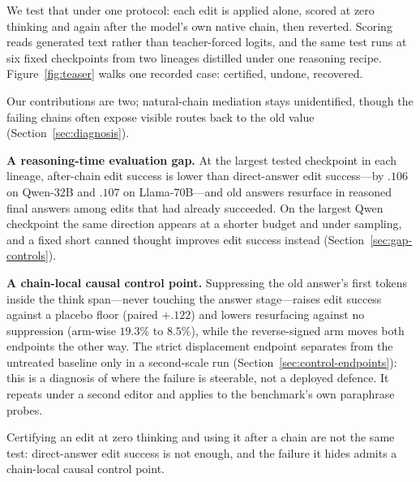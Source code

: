 \documentclass[letterpaper]{article} %
\begin{document}
We test that under one protocol: each edit is applied alone, scored at zero thinking and again after the model's own native chain, then reverted.  Scoring reads generated text rather than teacher-forced logits, and the same test runs at six fixed checkpoints from two lineages distilled under one reasoning recipe.  Figure~\ref{fig:teaser} walks one recorded case: certified, undone, recovered.

Our contributions are two; natural-chain mediation stays unidentified, though the failing chains often expose visible routes back to the old value (Section~\ref{sec:diagnosis}).

\textbf{A reasoning-time evaluation gap.}  At the largest tested checkpoint in each lineage, after-chain edit success is lower than direct-answer edit success---by \(.106\) on Qwen-32B and \(.107\) on Llama-70B---and old answers resurface in reasoned final answers among edits that had already succeeded.  On the largest Qwen checkpoint the same direction appears at a shorter budget and under sampling, and a fixed short canned thought improves edit success instead (Section~\ref{sec:gap-controls}). %

\textbf{A chain-local causal control point.}  Suppressing the old answer's first tokens inside the think span---never touching the answer stage---raises edit success against a placebo floor (paired \(+.122\)) and lowers resurfacing against no suppression (arm-wise \(19.3\%\) to \(8.5\%\)), while the reverse-signed arm moves both endpoints the other way.  The strict displacement endpoint separates from the untreated baseline only in a second-scale run (Section~\ref{sec:control-endpoints}): this is a diagnosis of where the failure is steerable, not a deployed defence.  It repeats under a second editor and applies to the benchmark's own paraphrase probes. %

Certifying an edit at zero thinking and using it after a chain are not the same test: direct-answer edit success is not enough, and the failure it hides admits a chain-local causal control point.
\end{document}
